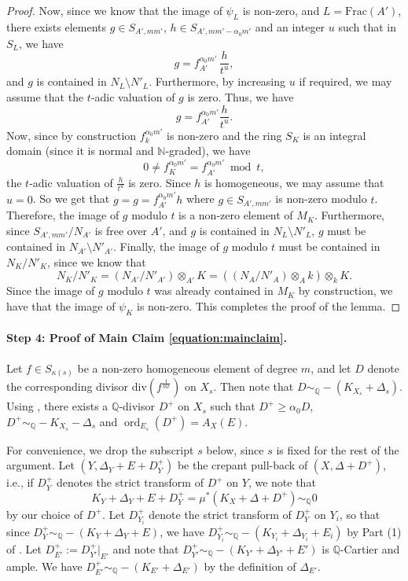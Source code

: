 \documentclass[11pt,reqno]{amsart}
\newcommand{\Q}{\mathbb{Q}}
\newcommand{\N}{\mathbb{N}}
\DeclareMathOperator{\ord}{ord}
\numberwithin{equation}{section}
\theoremstyle{definition}
\begin{document}
\begin{proof}
    
    Now, since we know that the image of $\psi_L$ is non-zero, and $L =\text{Frac}(A')$, there exists elements $g \in S_{A', mm'}$, $h \in S_{A', mm' - \alpha_0 m'}$ and an integer $u$ such that in $S_L$, we have
    \[ g = f_{A'} ^{\alpha_0 m'} \, \frac{h}{t^{u}}, \]
    and $g$ is contained in $N_L \setminus N' _L$. Furthermore, by increasing $u$ if required, we may assume that the $t$-adic valuation of $g$ is zero. Thus, we have
    \[ g = f_{A'} ^{ \alpha _0 m'} \frac{h}{t^u}. \]
    Now, since by construction $f_k ^{\alpha_0 m'}$ is non-zero and the ring $S_K$ is an integral domain (since it is normal and $\N$-graded), we have 
    \[ 0 \neq f^{\alpha_0  m'} _{K} = f^{\alpha_0  m'} _{A'} \bmod{t}, \] 
    the $t$-adic valuation of $\frac{h}{t^{u}}$ is zero. Since $h$ is homogeneous, we may assume that $u = 0$. So we get that 
    $g = g = f_{A'} ^{ \alpha _0 m'} h$
    where $g \in S_{A', mm'}$ is non-zero modulo $t$. Therefore, the image of $g$ modulo $t$ is a non-zero element of $M_K$. Furthermore, since 
    $S_{A', mm'}/N_{A'}$ is free over $A'$, and $g$ is contained in $N_L \setminus N'_L$, $g$ must be contained in $N_{A'} \setminus N' _{A'}$. Finally, the image of $g$ modulo $t$ must be contained in $N_K/N'_K$, since we know that 
    \[ N_K/N'_K = \left(N_{A'}/N'_{A'} \right) \otimes _{A'} K =\left( \left(N_{A}/N'_{A} \right) \otimes _{A} k \right) \otimes_k K.  \]
    Since the image of $g$ modulo $t$ was already contained in $M_K$ by construction, we have that the image of $\psi_K$ is non-zero. This completes the proof of the lemma. 
\end{proof}

\paragraph{\textbf{Step 4: Proof of Main Claim \ref{equation:mainclaim}.}} Let $f \in S_{\kappa(s)}$ be a non-zero homogeneous element of degree $m$, and let $D$ denote the corresponding divisor $\text{div}(f^{\frac{1}{mr}})$ on $X_s$. Then note that $D \sim_\Q -(K_{X_s} + \Delta_s)$. Using , there exists a $\Q$-divisor $D^+$ on $X_s$ such that $D^+ \geq \alpha_0 D$, $D^{+} \sim_\Q -K_{X_s} - \Delta_s$ and $\ord_{E_s} (D^+) = A_{X} (E)$.

For convenience, we drop the subscript $s$ below, since $s$ is fixed for the rest of the argument. Let $(Y, \Delta_Y+ E+D_Y^+)$ be the crepant pull-back of $(X, \Delta + D^+)$, i.e., if $D_Y ^+$ denotes the strict transform of $D^+$ on $Y$, we note that
\[ K_Y + \Delta_Y+ E + D^+ _Y = \mu^* (K_X + \Delta + D^+) \sim_\Q 0 \]
by our choice of $D^+$. Let $D^+ _{Y_i}$ denote the strict transform of $ D^+ _{Y}$ on $Y_i$, so that since $D^+ _Y \sim_\Q -(K_Y + \Delta_Y + E)$, we have $D^+ _{Y_i} \sim_\Q -(K_{Y_i} + \Delta_{Y_i} + E_i)$
by Part (1) of .
 Let $D_{E'}^+:=D_{Y'}^+|_{E'}$ and note that $D^+ _{Y'} \sim_\Q -(K_{Y'} + \Delta_{Y'}+ E') $ is $\Q$-Cartier and ample. We have $D_{E'} ^+ \sim _\Q -(K_{E'} + \Delta_{E'})$ by the definition of $\Delta_{E'}$.
\end{document}
